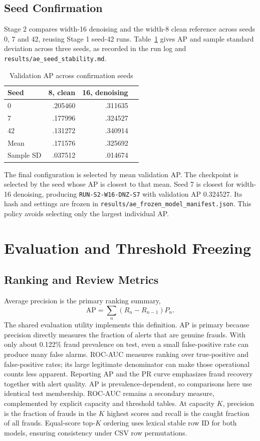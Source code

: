 \documentclass[conference]{IEEEtran}
\newcommand{\artifact}[1]{{\footnotesize\nolinkurl{#1}}}
\begin{document}
\subsection{Seed Confirmation}
Stage 2 compares width-16 denoising and the width-8 clean reference across seeds 0, 7 and 42, reusing Stage 1 seed-42 runs. Table~\ref{tab:seed} gives AP and sample standard deviation across three seeds, as recorded in the run log and \artifact{results/ae_seed_stability.md}.

\begin{table}[!ht]
\caption{Validation AP across confirmation seeds}\label{tab:seed}
\centering\footnotesize
\begin{tabular}{lrrr}\toprule
Seed & 8, clean & 16, denoising\\\midrule
0 & .205460 & .311635\\
7 & .177996 & .324527\\
42 & .131272 & .340914\\\midrule
Mean & .171576 & .325692\\
Sample SD & .037512 & .014674\\\bottomrule
\end{tabular}
\end{table}

The final configuration is selected by mean validation AP. The checkpoint is selected by the seed whose AP is closest to that mean. Seed 7 is closest for width-16 denoising, producing \texttt{RUN-S2-W16-DNZ-S7} with validation AP 0.324527. Its hash and settings are frozen in \artifact{results/ae_frozen_model_manifest.json}. This policy avoids selecting only the largest individual AP.

\section{Evaluation and Threshold Freezing}
\subsection{Ranking and Review Metrics}
Average precision is the primary ranking summary,
\begin{equation}
\mathrm{AP}=\sum_n(R_n-R_{n-1})P_n.
\end{equation}
The shared evaluation utility implements this definition. AP is primary because precision directly measures the fraction of alerts that are genuine frauds. With only about 0.122\% fraud prevalence on test, even a small false-positive rate can produce many false alarms. ROC-AUC measures ranking over true-positive and false-positive rates; its large legitimate denominator can make those operational counts less apparent. Reporting AP and the PR curve emphasizes fraud recovery together with alert quality. AP is prevalence-dependent, so comparisons here use identical test membership. ROC-AUC remains a secondary measure, complemented by explicit capacity and threshold tables. At capacity $K$, precision is the fraction of frauds in the $K$ highest scores and recall is the caught fraction of all frauds. Equal-score top-$K$ ordering uses lexical stable row ID for both models, ensuring consistency under CSV row permutations.
\end{document}
